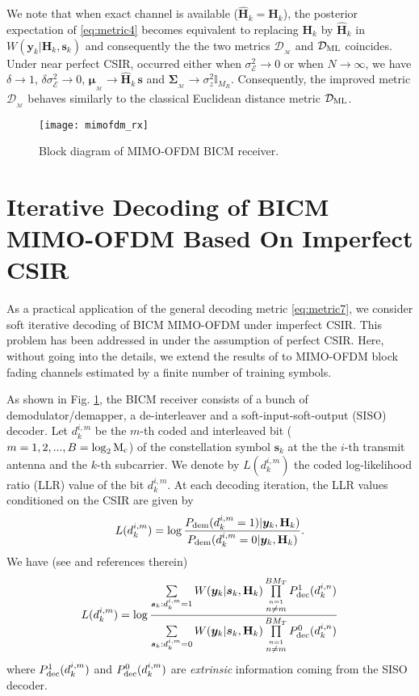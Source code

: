 \documentclass{article}
\def\W{,\thickspace}
\def\H{{\mathbf H}}
\def\HH{\widehat{{\mathbf H}}}
\def\y{{\bm y }}
\def\s{{\bm s }}
\def\W{{ W}}
\def\eye{{\mathbb I}}
\def\sig{\mathbf \Sigma}
\begin{document}
We note that when exact channel is available ($\HH_k=\H_k$), the posterior expectation of \eqref{eq:metric4} becomes equivalent to replacing $\H_k$ by $\HH_k$ in $\W(\y_k|\H_k,\s_k)$ and consequently the the two metrics $\mathcal{D}_{_\mathcal{M}}$ and $\mathcal{D}_{\rm ML}$ coincides. Under near perfect CSIR, occurred either when $\sigma^2_{\mathcal{E}} \to 0$ or when $N \to \infty$, we have $\delta \to 1$, $\delta \sigma^2_{\mathcal{E}} \to 0$,
$\boldsymbol{\mu}_{_\mathcal{M}} \to \HH_k \, \s$ and $\sig_{_\mathcal{M}} \to \sigma^2_z \eye_{M_R}$.
Consequently, the improved metric $\mathcal{D}_{_\mathcal{M}}$ behaves similarly to the classical Euclidean distance metric $\mathcal{D}_{\rm ML}$.
\begin{figure}[!t]
\centering
\texttt{[image: mimofdm\_rx]}
\caption{Block diagram of MIMO-OFDM BICM receiver.}\label{mimofdm_rx}
\end{figure}
\vspace{-3mm}
\section{Iterative Decoding of BICM MIMO-OFDM Based On Imperfect CSIR}
\label{sec:bicmRX}


As a practical application of the general decoding metric \eqref{eq:metric7}, we consider soft iterative decoding of BICM MIMO-OFDM under imperfect CSIR. This problem has been addressed in \cite{boutros00} under the assumption of perfect CSIR. Here, without going into the details, we extend the results of \cite{sadough06} to MIMO-OFDM block fading channels estimated by a finite number of training symbols.

As shown in Fig. \ref{mimofdm_rx}, the BICM receiver consists of a bunch of demodulator/demapper, a de-interleaver
and a soft-input-soft-output (SISO) decoder. Let $d_k^{i,m}$ be the $m$-th coded and interleaved bit ($m=1,2,...,B=\log_2 {\rm M_c}$) of the constellation symbol $\s_k$ at the the $i$-th transmit antenna and the $k$-th subcarrier.
We denote by $L(d_k^{i,m})$ the coded log-likelihood ratio (LLR) value of the bit $d_k^{i,m}$.
At each decoding iteration, the LLR values conditioned on the CSIR are given by
\begin{equation}
\label{eq:mimoRx1}
L(d_k^{i,m})=\log \frac{P_{\rm dem}(d_k^{i,m}= 1)|\y_k,\H_k)}{P_{\rm dem}(d_k^{i,m}=0|\y_k,\H_k)}.
\end{equation}
We have (see \cite{sadough06} and references therein)
\begin{equation}
\label{eq:mimoRx2}
L(d_k^{i,m})= \log \frac{\sum \limits_{\s_k:d_k^{i,m}=1} \W(\y_k|\s_k,\H_k) \prod \limits_{\stackrel{n=1}{n\neq m}}^{B M_T} P^1_{\rm dec}(d_k^{i,n})}{\sum \limits_{\s_k:d_k^{i,m}=0} \W(\y_k|\s_k,\H_k) \prod \limits_{\stackrel{n=1}{n\neq m}}^{B M_T} P^0_{\rm dec}(d_k^{i,n})}\vspace{-2mm}
\end{equation}
where $P^1_{\rm dec}(d_k^{i,m})$ and $P^0_{\rm dec}(d_k^{i,m})$ are {\it extrinsic} information coming from the SISO decoder.
\end{document}
